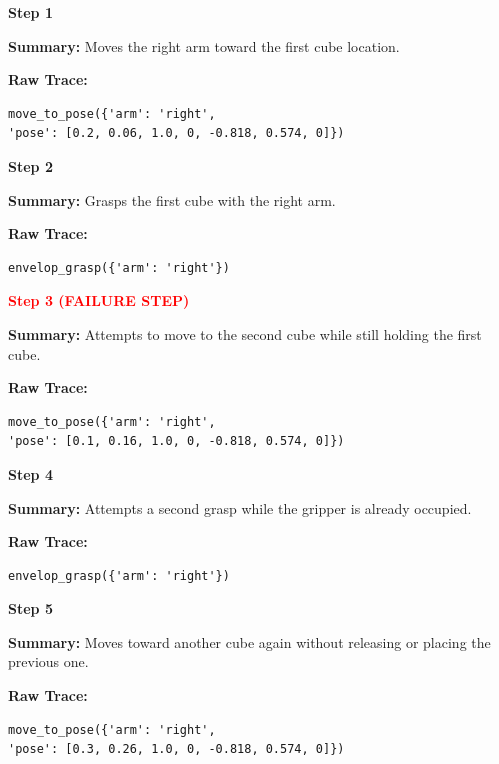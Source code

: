 \documentclass[11pt]{article}
\begin{document}
\begin{tcolorbox}[
breakable,
colback=customwhite,
colframe=customgreen,
title=Planning Error,
fontupper=\fontfamily{pcr}\selectfont\scriptsize
]

\textbf{Step 1}

\textbf{Summary:}  
Moves the right arm toward the first cube location.

\textbf{Raw Trace:}
\begin{verbatim}
move_to_pose({'arm': 'right',
'pose': [0.2, 0.06, 1.0, 0, -0.818, 0.574, 0]})
\end{verbatim}

\medskip
\textbf{Step 2}

\textbf{Summary:}  
Grasps the first cube with the right arm.

\textbf{Raw Trace:}
\begin{verbatim}
envelop_grasp({'arm': 'right'})
\end{verbatim}

\medskip
\textbf{\textcolor{red}{Step 3 (FAILURE STEP)}}

\textbf{Summary:}  
Attempts to move to the second cube while still holding the first cube.

\textbf{Raw Trace:}
\begin{verbatim}
move_to_pose({'arm': 'right',
'pose': [0.1, 0.16, 1.0, 0, -0.818, 0.574, 0]})
\end{verbatim}

\medskip
\textbf{Step 4}

\textbf{Summary:}  
Attempts a second grasp while the gripper is already occupied.

\textbf{Raw Trace:}
\begin{verbatim}
envelop_grasp({'arm': 'right'})
\end{verbatim}

\medskip
\textbf{Step 5}

\textbf{Summary:}  
Moves toward another cube again without releasing or placing the previous one.

\textbf{Raw Trace:}
\begin{verbatim}
move_to_pose({'arm': 'right',
'pose': [0.3, 0.26, 1.0, 0, -0.818, 0.574, 0]})
\end{verbatim}

\end{tcolorbox}

\end{document}
